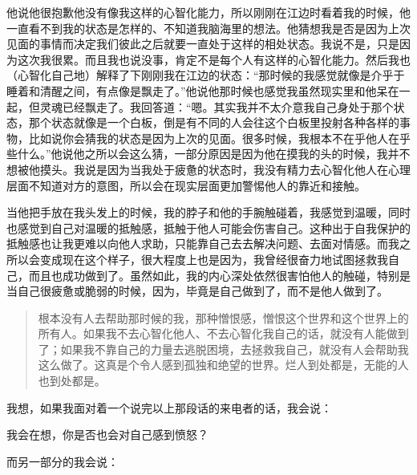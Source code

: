他说他很抱歉他没有像我这样的心智化能力，所以刚刚在江边时看着我的时候，他一直看不到我的状态是怎样的、不知道我脑海里的想法。他猜想我是否是因为上次见面的事情而决定我们彼此之后就要一直处于这样的相处状态。我说不是，只是因为这次我很累。而且我也说没事，肯定不是每个人有这样的心智化能力。然后我也（心智化自己地）解释了下刚刚我在江边的状态：“那时候的我感觉就像是介乎于睡着和清醒之间，有点像是飘走了。”他说他那时候也感觉我虽然现实里和他呆在一起，但灵魂已经飘走了。我回答道：“嗯。其实我并不太介意我自己身处于那个状态，那个状态就像是一个白板，倒是有不同的人会往这个白板里投射各种各样的事物，比如说你会猜我的状态是因为上次的见面。很多时候，我根本不在乎他人在乎些什么。”他说他之所以会这么猜，一部分原因是因为他在摸我的头的时候，我并不想被他摸头。我说是因为当我处于疲惫的状态时，我没有精力去心智化他人\pozhehao{}在心理层面不知道对方的意图，所以会在现实层面更加警惕他人的靠近和接触。

当他把手放在我头发上的时候，我的脖子和他的手腕触碰着，我感觉到温暖，同时也感觉到自己对温暖的抵触感，抵触于他人可能会伤害自己。这种出于自我保护的抵触感也让我更难以向他人求助，只能靠自己去去解决问题、去面对情感。而我之所以会变成现在这个样子，很大程度上也是因为，我曾经很奋力地试图拯救我自己，而且也成功做到了。虽然如此，我的内心深处依然很害怕他人的触碰，特别是当自己很疲惫或脆弱的时候，因为，毕竟是自己做到了，而不是他人做到了。

\blockquote{
	根本没有人去帮助那时候的我，那种憎恨感，憎恨这个世界和这个世界上的所有人。如果我不去心智化他人、不去心智化我自己的话，就没有人能做到了；如果我不靠自己的力量去逃脱困境，去拯救我自己，就没有人会帮助我这么做了。这真是个令人感到孤独和绝望的世界。烂人到处都是，无能的人也到处都是。
}

我想，如果我面对着一个说完以上那段话的来电者的话，我会说：

\begin{compactitem}
	\item 我会在想，你是否也会对自己感到愤怒？
\end{compactitem}

而另一部分的我会说：

